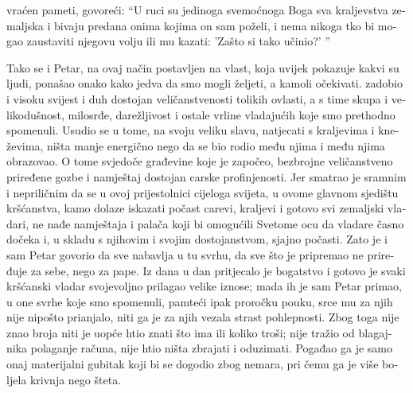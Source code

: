 \documentclass[a5paper,twoside]{article}
\begin{document}
\begin{pages}
\begin{Rightside}
\begin{croatian}
vraćen pameti, govoreći: ``U ruci su jedinoga svemoćnoga Boga sva kraljevstva zemaljska i bivaju predana onima kojima on sam poželi, i nema nikoga tko bi mogao zaustaviti njegovu volju ili mu kazati: 'Zašto si tako učinio?' ''
  
\pend
\pstart
Tako se i Petar, na ovaj način postavljen na vlast, koja uvijek pokazuje kakvi su ljudi, ponašao onako kako jedva da smo mogli željeti, a kamoli očekivati.   zadobio i visoku svijest i duh dostojan veličanstvenosti tolikih ovlasti, a s time skupa i velikodušnost, milosrđe, darežljivost i ostale vrline vladajućih koje smo prethodno spomenuli.  Usudio se u tome, na svoju veliku slavu, natjecati s kraljevima i kneževima, ništa manje energično nego da se bio rodio među njima i među njima obrazovao. O tome svjedoče građevine koje je započeo, bezbrojne veličanstveno priređene gozbe i namještaj dostojan carske profinjenosti.  Jer smatrao je sramnim i nepriličnim da se u ovoj prijestolnici cijeloga svijeta, u ovome glavnom sjedištu kršćanstva, kamo dolaze iskazati počast carevi, kraljevi i gotovo svi zemaljski vladari, ne nađe namještaja i palača koji bi omogućili Svetome ocu da vladare časno dočeka i, u skladu s njihovim i svojim dostojanstvom, sjajno počasti.  Zato je i sam Petar govorio da sve nabavlja u tu svrhu, da sve što je pripremao ne priređuje za sebe, nego za pape.  Iz dana u dan pritjecalo je bogatstvo i gotovo je svaki kršćanski vladar svojevoljno prilagao velike iznose; mada ih je sam Petar primao, u one svrhe koje smo spomenuli, pamteći ipak proročku pouku, srce mu za njih nije nipošto prianjalo, niti ga je za njih vezala strast pohlepnosti.  Zbog toga nije znao broja niti je uopće htio znati što ima ili koliko troši; nije tražio od blagajnika polaganje računa, nije htio ništa zbrajati i oduzimati.  Pogađao ga je samo onaj materijalni gubitak koji bi se dogodio zbog nemara, pri čemu ga je više boljela krivnja nego šteta.  


\end{croatian}
\end{Rightside}
\end{pages}
\end{document}
